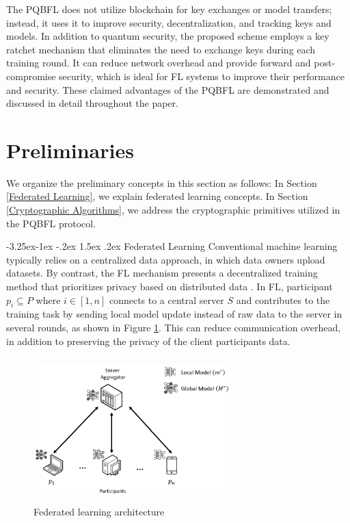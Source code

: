 \documentclass[a4paper,fleqn]{cas-dc}
\makeatletter
\renewcommand\subsection{\@startsection{subsection}{2}{\z@}%
   {-3.25ex\@plus -1ex \@minus -.2ex}%
   {1.5ex \@plus .2ex}%
   {\normalfont\large}} %
\makeatother
\begin{document}
The PQBFL does not utilize blockchain for key exchanges or model transfers; instead, it uses it to improve security, decentralization, and tracking keys and models.  
In addition to quantum security, the proposed scheme employs a key ratchet mechanism that eliminates the need to exchange keys during each training round.  
It can reduce network overhead and provide forward and post-compromise security, which is ideal for FL systems to improve their performance and security.  
These claimed advantages of the PQBFL are demonstrated and discussed in detail throughout the paper.


\section{Preliminaries}
\label{Preliminaries}

We organize the preliminary concepts in this section as follows: In Section \ref{Federated Learning}, we explain federated learning concepts.
In Section \ref{Cryptographic Algorithms}, we address the cryptographic primitives utilized in the PQBFL protocol.

\subsection{Federated Learning}
\label{Federated Learning}
Conventional machine learning typically relies on a centralized data approach, in which data owners upload datasets.
By contrast, the FL mechanism presents a decentralized training method that prioritizes privacy based on distributed data \citep{A_survey_on_federated}.
In FL, participant $p_{i} \subseteq P$ where $i \in [1,n]$ connects to a central server $S$ and contributes to the training task by sending local model update instead of raw data to the server in several rounds, as shown in Figure \ref{fig:FL architecture}.
This can reduce communication overhead, in addition to preserving the privacy of the client participants data.

\begin{figure}[ht]
\centering
\includegraphics[width=3in,height=2.2in]{Images/1.png}
\caption{Federated learning architecture}
\label{fig:FL architecture}
\end{figure}
\end{document}
